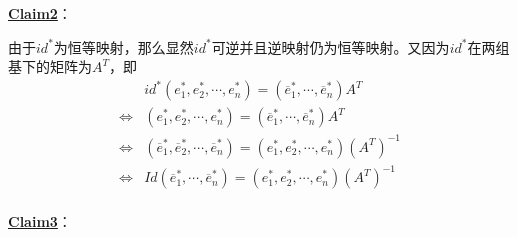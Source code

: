 \textbf{\underline{Claim2}}：{}

由于$id^{\ast}$为恒等映射，那么显然$id^{\ast}$可逆并且逆映射仍为恒等映射。又因为$id^{\ast}$在两组基下的矩阵为$A^{T}$，即
\[
\begin{split}
&id^{\ast}\left(e^{\ast}_{1},e^{\ast}_{2},\cdots,e^{\ast}_{n}  \right)=\left(\overline{e}^{\ast}_{1},\cdots,\overline{e}^{\ast}_{n} \right) A^{T}\\
\Leftrightarrow& \left(e^{\ast}_{1},e^{\ast}_{2},\cdots,e^{\ast}_{n}  \right)=\left(\overline{e}^{\ast}_{1},\cdots,\overline{e}^{\ast}_{n} \right) A^{T}\\
\Leftrightarrow& (\overline{e}^{\ast}_{1},\overline{e}^{\ast}_{2},\cdots,\overline{e}^{\ast}_{n})=(e^{\ast}_{1},e^{\ast}_{2},\cdots,e^{\ast}_{n})(A^{T})^{-1}\\
\Leftrightarrow& Id\left(\overline{e}^{\ast}_{1},\cdots,\overline{e}^{\ast}_{n} \right)=\left(e^{\ast}_{1},e^{\ast}_{2},\cdots,e^{\ast}_{n}  \right) (A^{T})^{-1}\\
\end{split}
\]

\textbf{\underline{Claim3}}：{}

